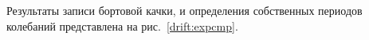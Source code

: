 Результаты записи бортовой качки, и определения собственных периодов колебаний представлена на рис.~\ref{drift:expcmp}.





